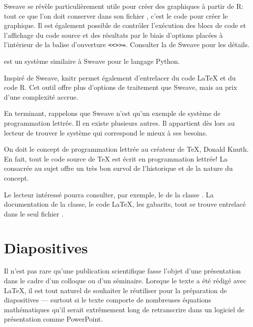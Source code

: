 Sweave se révèle particulièrement utile pour créer des graphiques à
partir de R: tout ce que l'on doit conserver dans son fichier
, c'est le code pour créer le graphique. Il est également
possible de contrôler l'exécution des blocs de code et l'affichage du
code source et des résultats par le biais d'options placées à
l'intérieur de la balise d'ouverture \verb|<<>>=|. Consulter la %
de Sweave pour les détails.

 est un système similaire à
Sweave pour le langage Python.

Inspiré de Sweave, knitr \citep{knitr} permet également d'entrelacer
du code {\LaTeX} et du code R. Cet outil offre plus d'options de
traitement que Sweave, mais au prix d'une complexité accrue.

En terminant, rappelons que Sweave n'est qu'un exemple de système de
programmation lettrée. Il en existe plusieurs autres. Il appartient
dès lors au lecteur de trouver le système qui correspond le mieux à
ses besoins.

\begin{information}
  On doit le concept de programmation lettrée au créateur de {\TeX},
  Donald Knuth.  En fait, tout le code source de {\TeX} est écrit
  en programmation lettrée! La %
  consacrée au sujet offre un très bon survol de l'historique et de la
  nature du concept.

  Le lecteur intéressé pourra consulter, par exemple, le %
  de la classe . La documentation de la classe, le
  code {\LaTeX}, les gabarits, tout se trouve entrelacé
  dans le seul fichier .
\end{information}

\newpage

\section{Diapositives}
\label{sec:trucs:diapositives}

Il n'est pas rare qu'une publication scientifique fasse l'objet d'une
présentation dans le cadre d'un colloque ou d'un séminaire. Lorsque le
texte a été rédigé avec {\LaTeX}, il est tout naturel de souhaiter le
réutiliser pour la préparation de diapositives --- surtout si le texte
comporte de nombreuses équations mathématiques qu'il serait
extrêmement long de retranscrire dans un logiciel de présentation
comme PowerPoint.


